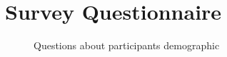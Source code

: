 \documentclass[manuscript,screen,review]{acmart}
\begin{document}
\section{Survey Questionnaire}
\begin{figure}[H]
    \caption{Questions about participants demographic}
    \label{fig:questionnaire-demographic}
\end{figure}
\end{document}
